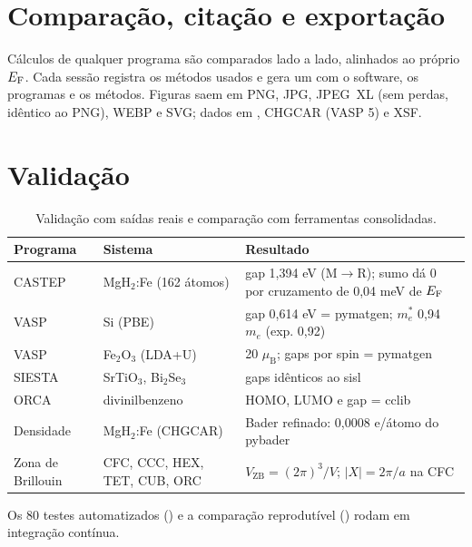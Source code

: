 \documentclass[11pt,a4paper]{article}
\begin{document}
\section{Comparação, citação e exportação}
Cálculos de qualquer programa são comparados lado a lado, alinhados ao próprio $E_\mathrm{F}$. Cada sessão registra os métodos usados e gera um  com o software, os programas e os métodos. Figuras saem em PNG, JPG, JPEG~XL (sem perdas, idêntico ao PNG), WEBP e SVG; dados em , CHGCAR (VASP 5) e XSF.

\section{Validação}
\begin{table}[h]\centering\small
\caption{Validação com saídas reais e comparação com ferramentas consolidadas.}
\begin{tabularx}{\linewidth}{@{}llX@{}}\toprule
Programa & Sistema & Resultado \\\midrule
CASTEP & MgH$_2$:Fe (162 átomos) & gap 1,394 eV (M$\to$R); sumo dá 0 por cruzamento de 0,04 meV de $E_\mathrm{F}$ \\
VASP & Si (PBE) & gap 0,614 eV = pymatgen; $m^*_e$ 0,94 $m_e$ (exp. 0,92) \\
VASP & Fe$_2$O$_3$ (LDA+U) & 20 $\mu_\mathrm B$; gaps por spin = pymatgen \\
SIESTA & SrTiO$_3$, Bi$_2$Se$_3$ & gaps idênticos ao sisl \\
ORCA & divinilbenzeno & HOMO, LUMO e gap = cclib \\
Densidade & MgH$_2$:Fe (CHGCAR) & Bader refinado: 0,0008 e/átomo do pybader \\
Zona de Brillouin & CFC, CCC, HEX, TET, CUB, ORC & $V_\mathrm{ZB}=(2\pi)^3/V$; $|X|=2\pi/a$ na CFC \\\bottomrule
\end{tabularx}\end{table}
Os 80 testes automatizados () e a comparação reprodutível () rodam em integração contínua.



\end{document}
